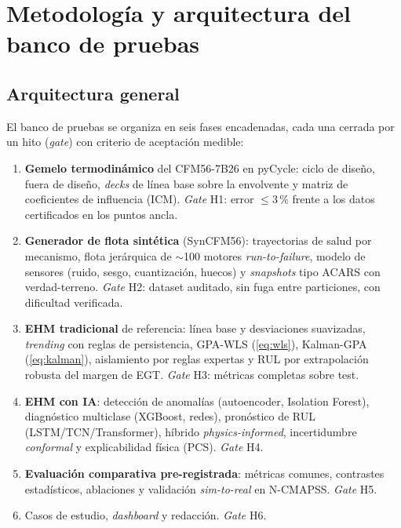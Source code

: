 \chapter{Metodología y arquitectura del banco de pruebas}
\label{cap:metodologia}

\section{Arquitectura general}

El banco de pruebas se organiza en seis fases encadenadas, cada una cerrada por un hito
(\emph{gate}) con criterio de aceptación medible:

\begin{enumerate}
  \item[\textbf{F1.}] \textbf{Gemelo termodinámico} del CFM56-7B26 en pyCycle: ciclo de diseño,
    fuera de diseño, \emph{decks} de línea base sobre la envolvente y matriz de coeficientes de
    influencia (ICM). \emph{Gate} H1: error $\leq 3$\,\% frente a los datos certificados en los
    puntos ancla.
  \item[\textbf{F2.}] \textbf{Generador de flota sintética} (SynCFM56): trayectorias de salud por
    mecanismo, flota jerárquica de $\sim$100 motores \emph{run-to-failure}, modelo de sensores
    (ruido, sesgo, cuantización, huecos) y \emph{snapshots} tipo ACARS con verdad-terreno.
    \emph{Gate} H2: dataset auditado, sin fuga entre particiones, con dificultad verificada.
  \item[\textbf{F3.}] \textbf{EHM tradicional} de referencia: línea base y desviaciones
    suavizadas, \emph{trending} con reglas de persistencia, GPA-WLS
    (\cref{eq:wls}), Kalman-GPA (\cref{eq:kalman}), aislamiento por reglas expertas y RUL por
    extrapolación robusta del margen de EGT. \emph{Gate} H3: métricas completas sobre test.
  \item[\textbf{F4.}] \textbf{EHM con IA}: detección de anomalías (autoencoder, Isolation
    Forest), diagnóstico multiclase (XGBoost, redes), pronóstico de RUL (LSTM/TCN/Transformer),
    híbrido \emph{physics-informed}, incertidumbre \emph{conformal} y explicabilidad
    física (PCS). \emph{Gate} H4.
  \item[\textbf{F5.}] \textbf{Evaluación comparativa pre-registrada}: métricas comunes,
    contrastes estadísticos, ablaciones y validación \emph{sim-to-real} en N-CMAPSS.
    \emph{Gate} H5.
  \item[\textbf{F6.}] Casos de estudio, \emph{dashboard} y redacción. \emph{Gate} H6.
\end{enumerate}

